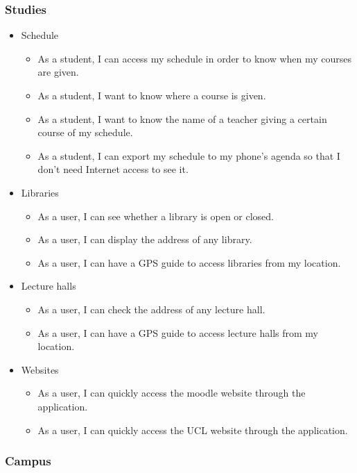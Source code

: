 \documentclass{eplmastersthesis}
\begin{document}
\subsubsection{Studies}

\begin{itemize}

\item Schedule
\begin{itemize}
\item As a student, I can access my schedule in order to know when my courses are given.
\item As a student, I want to know where a course is given.
\item As a student, I want to know the name of a teacher giving a certain course of my schedule.
\item As a student, I can export my schedule to my phone's agenda so that I don't need Internet access to see it.
\end{itemize}

\item Libraries
\begin{itemize}
\item As a user, I can see whether a library is open or closed.
\item As a user, I can display the address of any library.
\item As a user, I can have a GPS guide to access libraries from my location.
\end{itemize}

\item Lecture halls
\begin{itemize}
\item As a user, I can check the address of any lecture hall.
\item As a user, I can have a GPS guide to access lecture halls from my location.
\end{itemize}

\item Websites
\begin{itemize}
\item As a user, I can quickly access the moodle website through the application.
\item As a user, I can quickly access the UCL website through the application.
\end{itemize}

\end{itemize}

\subsubsection{Campus}
\end{document}
